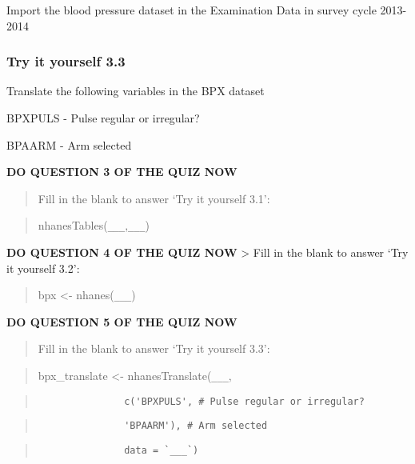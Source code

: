 \documentclass[
]{book}
\begin{document}
Import the blood pressure dataset in the Examination Data in survey cycle 2013-2014

\hypertarget{try-it-yourself-3.3}{%
\subsubsection{Try it yourself 3.3}\label{try-it-yourself-3.3}}

Translate the following variables in the BPX dataset

BPXPULS - Pulse regular or irregular?

BPAARM - Arm selected

\textbf{DO QUESTION 3 OF THE QUIZ NOW}

\begin{quote}
Fill in the blank to answer `Try it yourself 3.1':
\end{quote}

\begin{quote}
nhanesTables(\texttt{\_\_\_},\texttt{\_\_\_})
\end{quote}

\textbf{DO QUESTION 4 OF THE QUIZ NOW}
\textgreater{} Fill in the blank to answer `Try it yourself 3.2':

\begin{quote}
bpx \textless- nhanes(\texttt{\_\_\_})
\end{quote}

\textbf{DO QUESTION 5 OF THE QUIZ NOW}

\begin{quote}
Fill in the blank to answer `Try it yourself 3.3':
\end{quote}

\begin{quote}
bpx\_translate \textless- nhanesTranslate(\texttt{\_\_\_},
\end{quote}

\begin{quote}
\begin{verbatim}
               c('BPXPULS', # Pulse regular or irregular?
\end{verbatim}
\end{quote}

\begin{quote}
\begin{verbatim}
               'BPAARM'), # Arm selected
\end{verbatim}
\end{quote}

\begin{quote}
\begin{verbatim}
               data = `___`)
\end{verbatim}
\end{quote}
\end{document}
